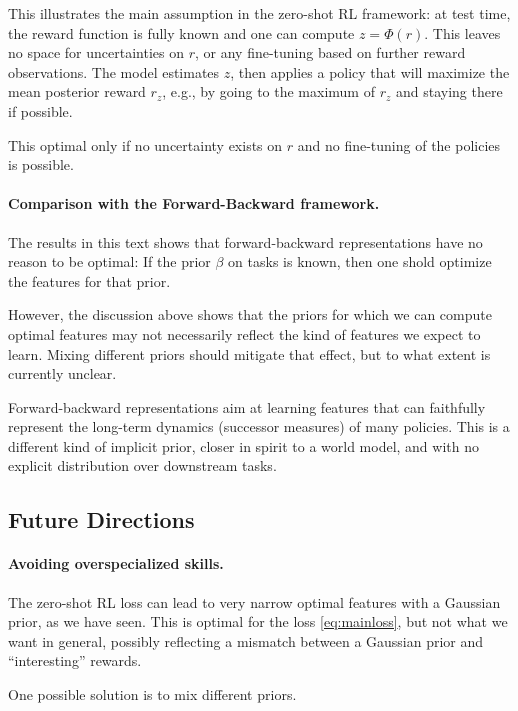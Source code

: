 \documentclass[11pt,a4paper]{article}
\begin{document}
This illustrates the main assumption in the zero-shot RL framework: at test
time, the reward function is fully known and one can compute $z=\Phi(r)$.
This leaves no space for uncertainties on $r$, or any fine-tuning based
on further reward observations. The model estimates $z$, then applies a
policy that will maximize the mean posterior reward $r_z$, e.g., by going
to the maximum of $r_z$ and staying there if possible.

This optimal only if no uncertainty exists on $r$ and no fine-tuning of
the policies is possible.

\paragraph{Comparison with the Forward-Backward framework.} The results
in this text shows that forward-backward representations \cite{zeroshot,
allpolicies} have no reason
to be optimal: If the prior $\beta$ on tasks is known, then one shold
optimize the features for that prior.

However, the discussion above shows that the priors for which we can
compute optimal features may not necessarily reflect the kind of features
we expect to learn. Mixing different priors should mitigate that effect,
but to what extent is currently unclear.

Forward-backward representations aim at learning features that can
faithfully represent the long-term dynamics (successor measures) of many
policies. This is a different kind of implicit prior, closer in spirit to
a world model, and with no explicit distribution over downstream tasks.

\subsection{Future Directions}
\label{sec:future}

\paragraph{Avoiding overspecialized skills.} The zero-shot RL loss can
lead to very narrow optimal features with a Gaussian prior, as we have
seen. This is optimal for the loss \eqref{eq:mainloss}, but not what we
want in general, possibly reflecting a mismatch between a Gaussian prior
and ``interesting'' rewards.

One possible solution is to mix different priors.
\end{document}
